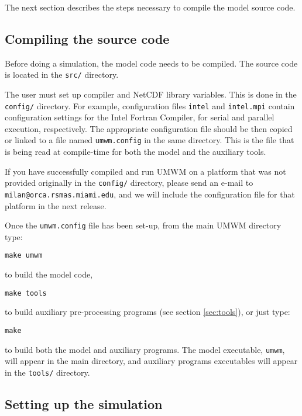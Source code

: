 \documentclass[letterpaper]{article}
\numberwithin{equation}{section}
\begin{document}
The next section describes the steps necessary to compile the model source code.

\subsection{Compiling the source code}
\label{sec:compilation}

Before doing a simulation, the model code needs to be compiled.
The source code is located in the \verb+src/+ directory.

The user must set up compiler and NetCDF library variables.
This is done in the \verb+config/+ directory.
For example, configuration files \verb+intel+ and \verb+intel.mpi+
contain configuration settings for the Intel Fortran Compiler,
for serial and parallel execution, respectively.
The appropriate configuration file should be then copied or linked
to a file named \verb+umwm.config+ in the same directory.
This is the file that is being read at compile-time for both the model
and the auxiliary tools.

If you have successfully compiled and run UMWM on a platform that was
not provided originally in the \verb+config/+ directory, please
send an e-mail to \verb+milan@orca.rsmas.miami.edu+, and we will
include the configuration file for that platform in the next release.

Once the \verb+umwm.config+ file has been set-up, from the main UMWM directory type:

\begin{verbatim}
make umwm
\end{verbatim}

to build the model code,

\begin{verbatim}
make tools
\end{verbatim}

to build auxiliary pre-processing programs (see section \ref{sec:tools}), or just type:

\begin{verbatim}
make
\end{verbatim}

to build both the model and auxiliary programs.
The model executable, \verb+umwm+, will appear in the main directory,
and auxiliary programs executables will appear in the \verb+tools/+ directory.

\subsection{Setting up the simulation}
\end{document}
